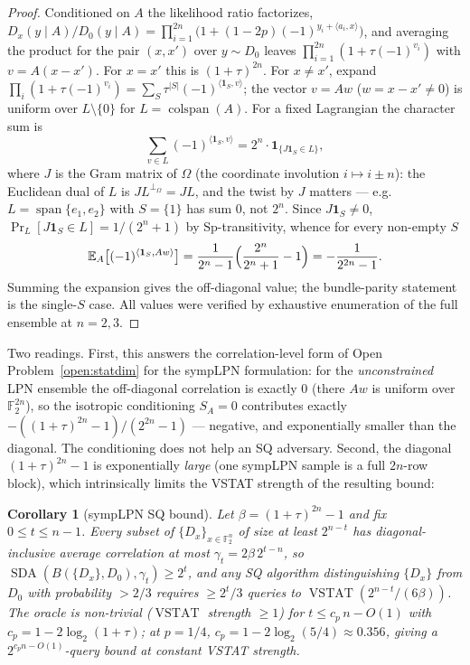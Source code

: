 \documentclass[11pt,a4paper]{article}
\theoremstyle{plain}
\newtheorem{corollary}[theorem]{Corollary}
\theoremstyle{definition}
\newcommand{\F}{\mathbb{F}}
\newcommand{\E}{\mathbb{E}}
\DeclareMathOperator{\SDA}{SDA}
\DeclareMathOperator{\VSTAT}{VSTAT}
\begin{document}
\begin{proof}
Conditioned on $A$ the likelihood ratio factorizes, $D_x(y \mid A)/D_0(y \mid A) = \prod_{i=1}^{2n} \bigl(1 + (1-2p)(-1)^{y_i + \langle a_i, x \rangle}\bigr)$, and averaging the product for the pair $(x,x')$ over $y \sim D_0$ leaves $\prod_{i=1}^{2n}(1 + \tau(-1)^{v_i})$ with $v = A(x - x')$. For $x = x'$ this is $(1+\tau)^{2n}$. For $x \neq x'$, expand $\prod_i (1 + \tau (-1)^{v_i}) = \sum_{S} \tau^{|S|} (-1)^{\langle \mathbf 1_S, v \rangle}$; the vector $v = Aw$ ($w = x - x' \neq 0$) is uniform over $L \setminus \{0\}$ for $L = \operatorname{colspan}(A)$. For a fixed Lagrangian the character sum is
\[
\sum_{v \in L} (-1)^{\langle \mathbf 1_S, v \rangle} = 2^n \cdot \mathbf 1_{\{J \mathbf 1_S \in L\}},
\]
where $J$ is the Gram matrix of $\Omega$ (the coordinate involution $i \mapsto i \pm n$): the Euclidean dual of $L$ is $J L^{\perp_\Omega} = JL$, and the twist by $J$ matters --- e.g.\ $L = \operatorname{span}\{e_1, e_2\}$ with $S = \{1\}$ has sum $0$, not $2^n$. Since $J \mathbf 1_S \neq 0$, $\Pr_L[J \mathbf 1_S \in L] = 1/(2^n+1)$ by $\mathrm{Sp}$-transitivity, whence for every non-empty $S$
\[
\E_A\bigl[(-1)^{\langle \mathbf 1_S, Aw \rangle}\bigr] = \frac{1}{2^n - 1}\Bigl(\frac{2^n}{2^n+1} - 1\Bigr) = -\frac{1}{2^{2n}-1}.
\]
Summing the expansion gives the off-diagonal value; the bundle-parity statement is the single-$S$ case. All values were verified by exhaustive enumeration of the full ensemble at $n = 2, 3$.
\end{proof}

Two readings. First, this answers the correlation-level form of Open Problem~\ref{open:statdim} for the sympLPN formulation: for the \emph{unconstrained} LPN ensemble the off-diagonal correlation is exactly $0$ (there $Aw$ is uniform over $\F_2^{2n}$), so the isotropic conditioning $S_A = 0$ contributes exactly $-((1+\tau)^{2n}-1)/(2^{2n}-1)$ --- negative, and exponentially smaller than the diagonal. The conditioning does not help an SQ adversary. Second, the diagonal $(1+\tau)^{2n}-1$ is exponentially \emph{large} (one sympLPN sample is a full $2n$-row block), which intrinsically limits the VSTAT strength of the resulting bound:

\begin{corollary}[sympLPN SQ bound]
\label{cor:symplpn-sq}
Let $\beta = (1+\tau)^{2n}-1$ and fix $0 \leq t \leq n-1$. Every subset of $\{D_x\}_{x \in \F_2^n}$ of size at least $2^{n-t}$ has diagonal-inclusive average correlation at most $\gamma_t = 2\beta\, 2^{t-n}$, so $\SDA(B(\{D_x\}, D_0), \gamma_t) \geq 2^t$, and any SQ algorithm distinguishing $\{D_x\}$ from $D_0$ with probability $> 2/3$ requires $\geq 2^t/3$ queries to $\VSTAT(2^{n-t}/(6\beta))$. The oracle is non-trivial ($\VSTAT$ strength $\geq 1$) for $t \leq c_p\, n - O(1)$ with $c_p = 1 - 2\log_2(1+\tau)$; at $p = 1/4$, $c_p = 1 - 2\log_2(5/4) \approx 0.356$, giving a $2^{c_p n - O(1)}$-query bound at constant VSTAT strength.
\end{corollary}
\end{document}
